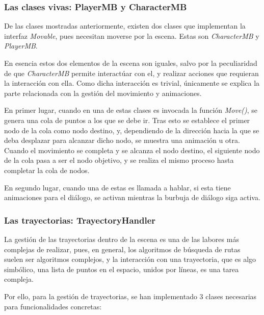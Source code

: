 \subsubsection{Las clases vivas: PlayerMB y CharacterMB}
\label{playerit2}

De las clases mostradas anteriormente, existen dos clases que implementan la interfaz \textit{Movable}, pues necesitan moverse por la escena. Estas son \textit{CharacterMB} y \textit{PlayerMB}.

En esencia estos dos elementos de la escena son iguales, salvo por la peculiaridad de que \textit{CharacterMB} permite interactúar con el, y realizar acciones que requieran la interacción con ella. Como dicha interacción es trivial, únicamente se explica la parte relacionada con la gestión del movimiento y animaciones.

En primer lugar, cuando en una de estas clases es invocada la función \textit{Move()}, se genera una cola de puntos a los que se debe ir. Tras esto se establece el primer nodo de la cola como nodo destino, y, dependiendo de la dirección hacia la que se deba desplazar para alcanzar dicho nodo, se muestra una animación u otra. Cuando el movimiento se completa y se alcanza el nodo destino, el siguiente nodo de la cola pasa a ser el nodo objetivo, y se realiza el mismo proceso hasta completar la cola de nodos. 

En segundo lugar, cuando una de estas es llamada a hablar, si esta tiene animaciones para el diálogo, se activan mientras la burbuja de diálogo siga activa.

\subsubsection{Las trayectorias: TrayectoryHandler}
\label{trajectoryit2}

La gestión de las trayectorias dentro de la escena es una de las labores más complejas de realizar, pues, en general, los algoritmos de búsqueda de rutas suelen ser algoritmos complejos, y la interacción con una trayectoria, que es algo simbólico, una lista de puntos en el espacio, unidos por líneas, es una tarea compleja.

Por ello, para la gestión de trayectorias, se han implementado 3 clases necesarias para funcionalidades concretas:

